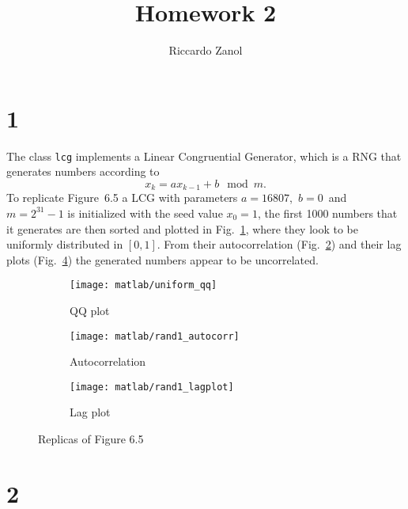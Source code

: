 \documentclass[a4paper,oneside]{article}
\author{Riccardo Zanol}
\title{Homework 2}
\newcommand{\inlinecode}[1]{\lstinline[basicstyle=\ttfamily,keywordstyle={},stringstyle={},commentstyle={\itshape}]{#1}}
\begin{document}
\maketitle
\section*{1}
The class \inlinecode{lcg} implements a Linear Congruential Generator,
which is a RNG that generates numbers according to
\[ x_{k} = ax_{k-1} +b \mod m . \]
To replicate Figure~6.5 a LCG with parameters
$a=16807$,~$b=0$~and~$m=2^{31}-1$ is initialized with the seed value
$x_0 = 1$, the first 1000 numbers that it generates are then sorted
and plotted in Fig.~\ref{plot:qqplot}, where they look to be uniformly
distributed in $[0,1]$.  From their autocorrelation
(Fig.~\ref{plot:autocorr}) and their lag plots
(Fig.~\ref{plot:lagplot}) the generated numbers appear to be
uncorrelated.
\begin{figure}[htbp]
  \centering
  \begin{subfigure}{0.5\textwidth}
    \centering
    \texttt{[image: matlab/uniform\_qq]}
    \caption{QQ plot}
    \label{plot:qqplot}
  \end{subfigure}%
  \begin{subfigure}{0.5\textwidth}
        \centering
    \texttt{[image: matlab/rand1\_autocorr]}
    \caption{Autocorrelation}
    \label{plot:autocorr}
  \end{subfigure}
  \begin{subfigure}{0.5\textwidth}
        \centering
    \texttt{[image: matlab/rand1\_lagplot]}
    \caption{Lag plot}
    \label{plot:lagplot}
  \end{subfigure}
  \caption{Replicas of Figure 6.5}
\end{figure}

\section*{2}
\end{document}

